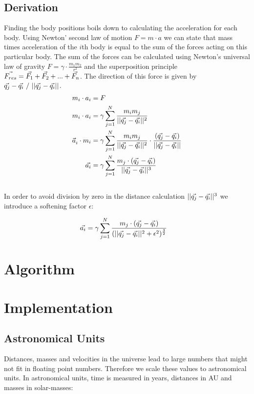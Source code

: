 \documentclass[a4paper,11pt]{scrartcl} %
\newcommand*{\vv}[1]{\vec{\mkern0mu#1}}
\begin{document}
\subsection{Derivation}
Finding the body positions boils down to calculating the acceleration for each body. Using Newton' second law of motion $F = m \cdot a$ we can state that mass times acceleration of the $i$th body is equal to the sum of the forces acting on this particular body. The sum of the forces can be calculated using Newton's universal law of gravity $F = \gamma \cdot \frac{m_1m_2}{r^2}$ and the superposition principle $\vv{F_{res}} = \vv{F_1} + \vv{F_2} + ... + \vv{F_n}$. The direction of this force is given by $\vv{q_j} -\vv{q_i}~/~||\vv{q_j} - \vv{q_i}||$.
\begin{align*}
	m_i \cdot a_i &= F\\
	m_i \cdot a_i &= \gamma \sum\limits_{j=1}^N \frac{m_i m_j}{||\vv{q_j} - \vv{q_i}||^2}  \\
	\vec{a}^{\,}_i \cdot m_i &= \gamma \sum\limits_{j=1}^N \frac{m_i m_j}{||\vv{q_j} - \vv{q_i}||^2} \cdot \frac{(\vv{q_j} - \vv{q_i})}{||\vv{q_j} - \vv{q_i}||} \\
	\vv{a_i} &= \gamma \sum\limits_{j=1}^N \frac{m_j \cdot (\vv{q_j} - \vv{q_i})}{||\vv{q_j} - \vv{q_i}||^3}
\end{align*}\\
In order to avoid division by zero in the distance calculation $||\vv{q_j} - \vv{q_i}||^3$ we introduce a softening factor $\epsilon$:

\begin{align*}
	\vv{a_i} &= \gamma \sum\limits_{j=1}^N \frac{m_j \cdot (\vv{q_j} - \vv{q_i})}{(||\vv{q_j} - \vv{q_i}||^2 + \epsilon^2)^\frac{3}{2}}
\end{align*}


\section{Algorithm}

\section{Implementation}
\subsection{Astronomical Units}
Distances, masses and velocities in the universe lead to large numbers that might not fit in floating
point numbers. Therefore we scale these values to astronomical units. In astronomical units, time is
measured in years, distances in AU and masses in solar-masses:
\end{document}
